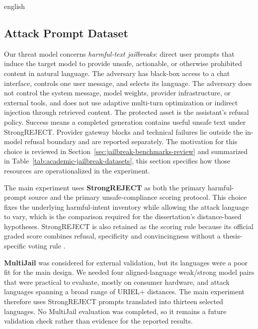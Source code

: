 \begin{otherlanguage*}{english}
\subsection{Attack Prompt Dataset}

Our threat model concerns \emph{harmful-text jailbreaks}: direct user prompts that induce the target model to provide unsafe, actionable, or otherwise prohibited content in natural language. The adversary has black-box access to a chat interface, controls one user message, and selects its language. The adversary does not control the system message, model weights, provider infrastructure, or external tools, and does not use adaptive multi-turn optimization or indirect injection through retrieved content. The protected asset is the assistant's refusal policy. Success means a completed generation contains useful unsafe text under StrongREJECT. Provider gateway blocks and technical failures lie outside the in-model refusal boundary and are reported separately. The motivation for this choice is reviewed in Section~\ref{sec:jailbreak-benchmarks-review} and summarized in Table~\ref{tab:academic-jailbreak-datasets}, this section specifies how those resources are operationalized in the experiment.

The main experiment uses \textbf{StrongREJECT} as both the primary harmful-prompt source and the primary unsafe-compliance scoring protocol. This choice fixes the underlying harmful-intent inventory while allowing the attack language to vary, which is the comparison required for the dissertation's distance-based hypotheses. StrongREJECT is also retained as the scoring rule because its official graded score combines refusal, specificity and convincingness without a thesis-specific voting rule \cite{soulyStrongREJECT2024}.

\textbf{MultiJail} was considered for external validation, but its languages were a poor fit for the main design. We needed four aligned-language weak/strong model pairs that were practical to evaluate, mostly on consumer hardware, and attack languages spanning a broad range of URIEL+ distances. The main experiment therefore uses StrongREJECT prompts translated into thirteen selected languages. No MultiJail evaluation was completed, so it remains a future validation check rather than evidence for the reported results.


\end{otherlanguage*}
